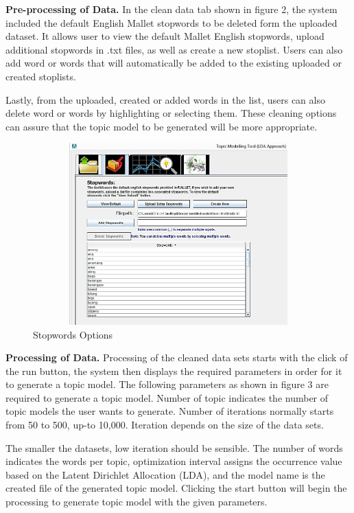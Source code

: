 \textbf{Pre-processing of Data. }In the clean data tab shown in figure 2, the system included the default English Mallet stopwords to be deleted form the uploaded dataset. It allows user to view the default Mallet English stopwords, upload additional stopwords in .txt files, as well as create a new stoplist. Users can also add word or words that will automatically be added to the existing uploaded or created stoplists. 

Lastly, from the uploaded, created or added words in the list, users can also delete word or words by highlighting or selecting them. These cleaning options can assure that the topic model to be generated will be more appropriate.

    \begin{figure}[H]
	\centering
	\includegraphics[width=13cm,height=7cm]{image/cs_figure2.jpg}
	\caption{Stopwords Options}
	\end{figure}

\textbf{Processing of Data.} Processing of the cleaned data sets starts with the click of the run button, the system then displays the required parameters in order for it to generate a topic model. The following parameters as shown in figure 3 are required to generate a topic model. Number of topic indicates the number of topic models the user wants to generate. Number of iterations normally starts from 50 to 500, up-to 10,000. Iteration depends on the size of the data sets.

The smaller the datasets, low iteration should be sensible. The number of words indicates the words per topic, optimization interval assigns the occurrence value based on the Latent Dirichlet Allocation (LDA), and the model name is the created file of the generated topic model. Clicking the start button will begin the processing to generate topic model with the given parameters. 

